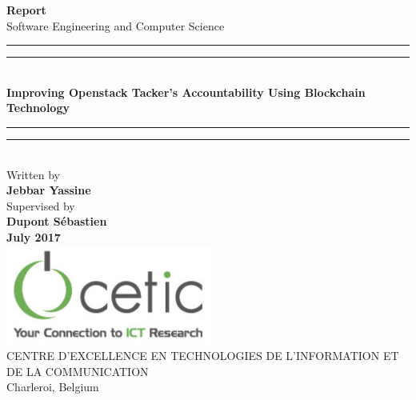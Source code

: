 \begin{titlepage}

\begin{center}
\vspace*{-1.55cm}
\textup{\small {\bf Report } \\ [0.3cm] Software Engineering and Computer Science}\\[0.4in]

\rule{\textwidth}{1.6pt}\vspace*{-\baselineskip}\vspace*{2pt} %
\rule{\textwidth}{0.4pt}\\[\baselineskip] %
\LARGE \textbf {Improving Openstack Tacker's Accountability Using Blockchain Technology}\\[0.15cm]
\rule{\textwidth}{1.6pt}\vspace*{-\baselineskip}\vspace*{2pt} %
\rule{\textwidth}{0.4pt}\\[\baselineskip] %
       



\small Written by \\[0.15cm]
{\textbf{\small Jebbar Yassine}}\\[0.35in]  



\small Supervised by \\
{\textbf{\small Dupont Sébastien }}\\
[2cm]
\large{\textbf{July 2017}}\\
[3.0cm]

\includegraphics[scale=0.52]{cetic} \\[0.45cm]

\normalsize
\textsc{CENTRE D'EXCELLENCE EN TECHNOLOGIES DE L'INFORMATION ET DE LA COMMUNICATION}\\[0.35cm]
 Charleroi, Belgium \\
\vspace{0.35cm}


\end{center}

\end{titlepage}
